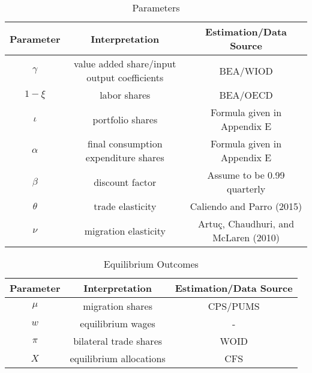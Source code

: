 \documentclass{article}
\begin{document}
\begin{table}[h!]
\begin{center}
 \begin{tabular}{c |c| c} 
 \hline
 Parameter & Interpretation  & Estimation/Data Source  \\ [0.5ex] 
 \hline\hline
 $\gamma$ & value added share/input output coefficients & BEA/WIOD \\ 
 \hline
 $1-\xi$ & labor shares & BEA/OECD  \\
 \hline
 $\iota$ & portfolio shares & Formula given in Appendix E  \\
 \hline
 $\alpha$ & final consumption expenditure shares & Formula given in Appendix E  \\
 \hline
 $\beta$ & discount factor & Assume to be 0.99 quarterly \\ 
 \hline
 $\theta$ & trade elasticity & Caliendo and Parro (2015)  \\ 
 \hline
 $\nu$ & migration elasticity & Artuç, Chaudhuri, and McLaren (2010)   \\ 
 \hline
\end{tabular}
\end{center}
\caption{Parameters}
\label{table:1}
\end{table}

\begin{table}[!h]
\begin{center}
 \begin{tabular}{c |c| c} 
 \hline
 Parameter & Interpretation  & Estimation/Data Source  \\ [0.5ex] 
 \hline\hline
 $\mu$ & migration shares & CPS/PUMS \\ 
 \hline
 $w$ & equilibrium wages & -  \\
 \hline
 $\pi$ & bilateral trade shares & WOID  \\
 \hline
 $X$ & equilibrium allocations & CFS  \\
 \hline
\end{tabular}
\end{center}
\caption{Equilibrium Outcomes}
\label{table:1}
\end{table}
\end{document}
